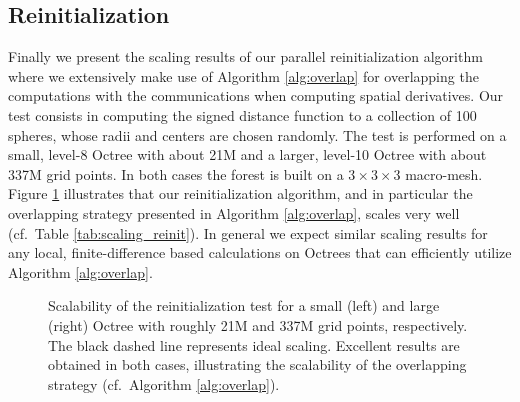 \subsection{Reinitialization} \label{section::scaling_reinitialization}

Finally we present the scaling results of our parallel reinitialization algorithm where we extensively make use of Algorithm \ref{alg:overlap} for overlapping the computations with the communications when computing spatial derivatives. Our test consists in computing the signed distance function to a collection of 100 spheres, whose radii and centers are chosen randomly. The test is performed on a small, level-8 Octree with about 21M and a larger, level-10 Octree with about 337M grid points. In both cases the forest is built on a $3\times3\times3$ macro-mesh. Figure \ref{fig:reinit} illustrates that our reinitialization algorithm, and in particular the overlapping strategy presented in Algorithm \ref{alg:overlap}, scales very well (cf.\ Table \ref{tab:scaling_reinit}). In general we expect similar scaling results for any local, finite-difference based calculations on Octrees that can efficiently utilize Algorithm \ref{alg:overlap}. 
\begin{figure}
\centering
{}
\caption{Scalability of the reinitialization test for a small (left) and large (right) Octree with roughly 21M and 337M grid points, respectively. The black dashed line represents ideal scaling. Excellent results are obtained in both cases, illustrating the scalability of the overlapping strategy (cf.\ Algorithm \ref{alg:overlap}).}
\label{fig:reinit}
\end{figure}

